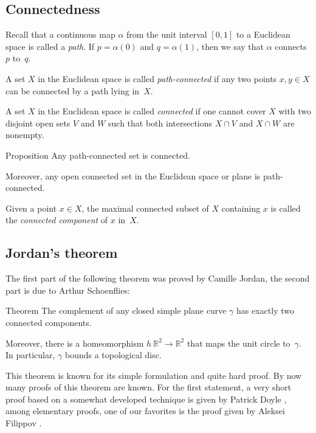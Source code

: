 \subsection*{Connectedness}

Recall that a continuous map $\alpha$ from the unit interval $[0,1]$ to a Euclidean space is called a \emph{path}.
If $p=\alpha (0)$ and $q = \alpha (1)$, then we say that $\alpha$ connects $p$ to~$q$.


A set $X$ in the Euclidean space is called \emph{path-connected} if any two points $x,y\in X$ can be connected by a path lying in~$X$.

A set $X$ in the Euclidean space is called \emph{connected} if one cannot cover $X$ with two disjoint open sets $V$ and $W$ such that both intersections $X\cap V$ and $X\cap W$ are nonempty.

\begin{thm}{Proposition}
Any path-connected set is connected.

Moreover, any open connected set in the Euclidean space or plane is path-connected.
\end{thm}

Given a point $x\in X$, the maximal connected subset of $X$ containing $x$ is called the \emph{connected component} of $x$ in~$X$.

\subsection*{Jordan's theorem}

The first part of the following theorem was proved by Camille Jordan, the second part is due to Arthur Schoenflies:

\begin{thm}{Theorem}\label{thm:jordan}
The complement of any closed simple plane curve $\gamma$ has exactly two connected components. 

Moreover, there is a homeomorphism $h\:\mathbb{R}^2\to \mathbb{R}^2$ that maps the unit circle to~$\gamma$.
In particular, $\gamma$ bounds a topological disc.
\end{thm}

This theorem is known for its simple formulation and quite hard proof.
By now many proofs of this theorem are known.
For the first statement, a very short proof based on a somewhat developed technique is given by Patrick Doyle \cite{doyle},
among elementary proofs, one of our favorites is the proof given by Aleksei Filippov \cite{filippov}.

